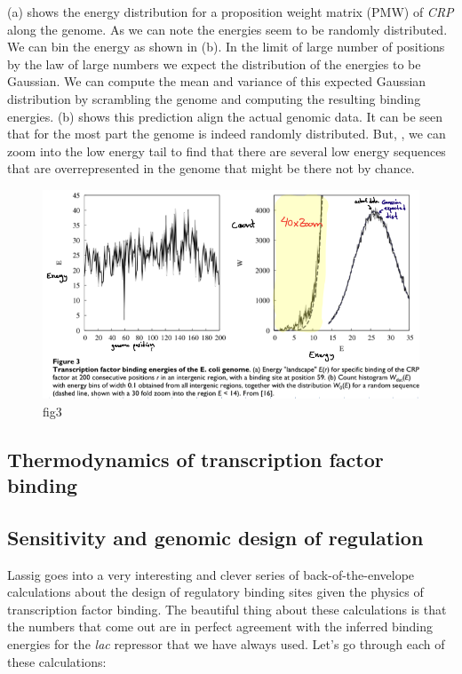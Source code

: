 (a) shows the energy distribution for a proposition
weight matrix (PMW) of {\it CRP} along the genome. As we can note the energies
seem to be randomly distributed. We can bin the energy as shown in
(b). In the limit of large number of positions by the
law of large numbers we expect the distribution of the energies to be Gaussian.
We can compute the mean and variance of this expected Gaussian distribution by
scrambling the genome and computing the resulting binding energies.
(b) shows this prediction align the actual genomic
data. It can be seen that for the most part the genome is indeed randomly
distributed. But, , we
can zoom into the low energy tail to find that there are several low energy
sequences that are overrepresented in the genome that might be there not by
chance.

\begin{figure}[h!]
	\centering \includegraphics[scale=0.5]{../fig/lassig_2007/fig3.png}
	\caption{fig3}
  \label{fig_tf_binding_ecoli}
\end{figure}

\subsection{Thermodynamics of transcription factor binding}

\subsection{Sensitivity and genomic design of regulation}
Lassig goes into a very interesting and clever series of back-of-the-envelope
calculations about the design of regulatory binding sites given the physics of
transcription factor binding. The beautiful thing about these calculations is
that the numbers that come out are in perfect agreement with the inferred
binding energies for the {\it lac} repressor that we have always used. Let's go
through each of these calculations:

